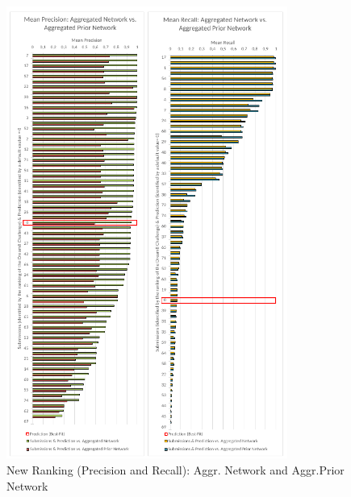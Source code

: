 \begin{figure}[H]
\centering
\includegraphics[width=0.82\textwidth]{./Bilder/Scoring/dreamchallenge/Recall_precision_vertical_comparison.pdf}
\caption[New Ranking: Precision and Recall]{New Ranking (Precision and Recall): Aggr. Network and Aggr.Prior Network}
\label{fig:}
\end{figure}

